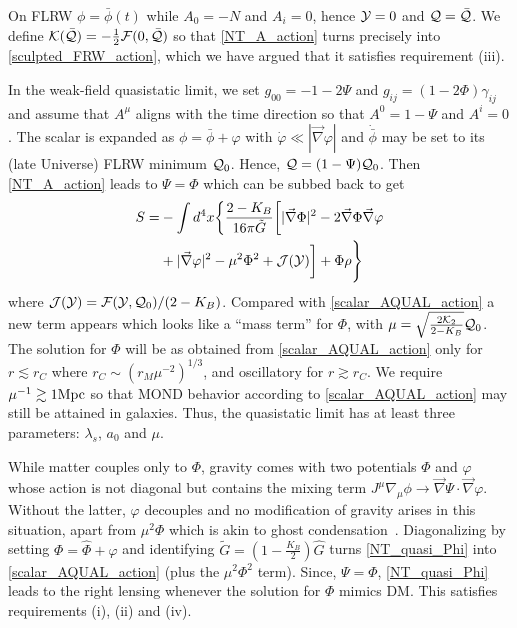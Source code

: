 \documentclass[twocolumn,prl,preprintnumbers,amsmath,amssymb,nofootinbib]{revtex4-2}
\newcommand{\Mpc}{\ensuremath{{\rm Mpc}}}
\newcommand{\grad}{\ensuremath{\vec{\nabla}}}
\newcommand{\phib}{{\bar{\phi}}}
\newcommand{\lambdas}{\lambda_s}
\newcommand{\PhiE}{\hat{\Phi}}
\newcommand{\Kcal}{{\cal K}}
\newcommand{\Ah}{{A}}
\newcommand{\Fcal}{{\cal F}}
\newcommand{\Qcalb}{\bar{{\cal Q}}}
\newcommand{\Qcal}{{\cal Q}}
\newcommand{\Ycal}{{\cal Y}}
\newcommand{\Jcal}{{\cal J}}
\newcommand{\Gqs}{\ensuremath{\hat{G}}}
\newcommand{\Gt}{\ensuremath{\tilde{G}}}
\newcommand{\KB}{\ensuremath{K_{B}}}
\begin{document}
On FLRW $\phi= \phib(t)$ while $\Ah_0 = -N$ and $\Ah_i = 0$, hence $\Ycal =0$ and $\Qcal = \Qcalb$. We define
$\Kcal(\Qcalb) = -\frac{1}{2}\Fcal(0,\Qcalb)$ so that \eqref{NT_A_action} turns  precisely into  \eqref{sculpted_FRW_action}, which we have 
argued that it satisfies requirement (iii).

In the weak-field quasistatic limit, we set $g_{00} = -1-2\Psi$ and $g_{ij} = (1-2\Phi)\gamma_{ij}$ and
  assume that $\Ah^\mu$ aligns with the time direction so that $\Ah^0 = 1-\Psi$ and $\Ah^i=0$.
 The scalar is expanded as $\phi = \phib + \varphi$ with $\dot{\varphi} \ll |\grad\varphi|$ and $\dot{\phib}$ may be set to its (late Universe)
FLRW minimum $\Qcal_0$. Hence, $\Qcal =  (1-\Psi)  \Qcal_0 $.
 Then \eqref{NT_A_action}  leads to $\Psi = \Phi$ which can be subbed back to get
\begin{align}
S =& - \int d^4x  \bigg\{
\frac{2-\KB}{16\pi \Gt} \bigg[ |\grad\Phi|^2 
- 2  \grad \Phi \grad \varphi
\nonumber
\\
&
+ |\grad \varphi|^2
- \mu^2 \Phi^2
+ \Jcal(\Ycal)
\bigg]
+  \Phi \rho\Bigg\}
\label{NT_quasi_Phi}
\end{align}
where $\Jcal(\Ycal) =  \Fcal(\Ycal,\Qcal_0)/ (2-\KB)$.
Compared with \eqref{scalar_AQUAL_action} a new term appears 
which looks like a ``mass term''  for  $\Phi$, with $\mu = \sqrt{\frac{2 \Kcal_2}{2-\KB}} \Qcal_0 $.
The solution for $\Phi$ will be as obtained from  \eqref{scalar_AQUAL_action} only for $r \lesssim r_C$ where $r_C \sim \left(r_M \mu^{-2}\right)^{1/3}$, and oscillatory for $r \gtrsim r_C$.
We require $\mu^{-1} \gtrsim 1 \Mpc$ so that MOND behavior according to \eqref{scalar_AQUAL_action} may still be attained in galaxies.
Thus, the quasistatic limit has at least three parameters: $\lambdas$, $a_0$ and $\mu$.

While matter couples only to $\Phi$, gravity comes with 
two potentials $\Phi$ and $\varphi$ whose action is not diagonal but contains the  mixing term $J^\mu\nabla_\mu\phi \rightarrow  \grad\Psi \cdot \grad\varphi$.
Without the latter, $\varphi$ decouples and  no  modification of gravity arises in this situation, apart from $\mu^2\Phi$ which 
   is akin to ghost condensation~\cite{ArkaniHamedEtAl2003,ArkaniHamed:2005gu}.
Diagonalizing by setting $\Phi = \PhiE + \varphi$ and identifying $\Gt = (1 - \frac{\KB}{2})\Gqs$ turns  \eqref{NT_quasi_Phi} into \eqref{scalar_AQUAL_action} (plus the $\mu^2 \Phi^2$ term).
Since, $\Psi =\Phi$, \eqref{NT_quasi_Phi} leads to the right lensing whenever the solution for $\Phi$ mimics DM.
 This satisfies requirements (i), (ii) and (iv).
\end{document}
